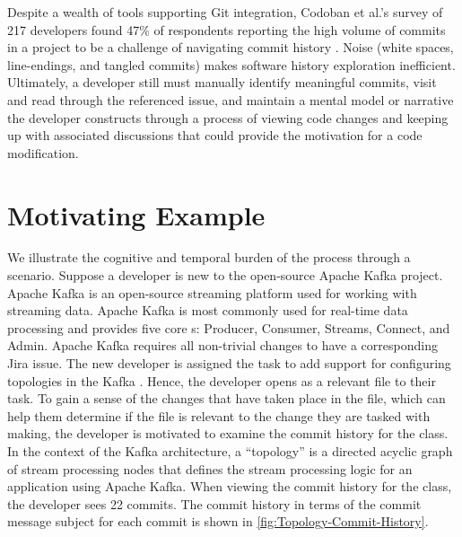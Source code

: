 Despite a wealth of tools supporting Git integration, 
Codoban et al.'s survey of 217 developers found 47\% of respondents reporting the high volume of 
commits in a project to be a challenge of navigating commit history \cite{codoban_software_2015}. 
Noise (\eg white spaces, line-endings, and tangled commits) makes software history exploration inefficient. 
Ultimately, a developer still must manually identify meaningful commits, 
visit and read through the referenced issue, and maintain a mental model or narrative  
the developer constructs through a process of viewing code changes and keeping up with 
associated discussions that could provide the motivation for a code modification. 


\section{Motivating Example}

We illustrate the cognitive and temporal burden of the process through a scenario.
Suppose a developer is new to the open-source Apache Kafka project. 
Apache Kafka is an open-source streaming platform used for working with streaming data. 
Apache Kafka is most commonly used for real-time data processing and provides five core s: 
Producer, Consumer, Streams, Connect, and Admin.
Apache Kafka requires all non-trivial changes to have a corresponding Jira issue. 
The new developer is assigned the task to add support for configuring topologies in the Kafka .
Hence, the developer opens  as a relevant file to their task.
To gain a sense of the changes that have taken place in the file,
which can help them determine if the file is relevant to the change they are tasked with making,
the developer is motivated to examine the commit history for the  class.
In the context of the Kafka architecture, a ``topology'' is a directed acyclic graph of stream processing nodes 
that defines the stream processing logic for an application using Apache Kafka.
When viewing the commit history for the  class, the developer sees 22 commits.
The commit history in terms of the commit message subject for each commit is shown in \autoref{fig:Topology-Commit-History}.

